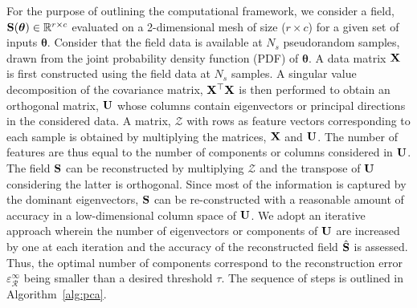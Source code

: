 For the purpose of outlining the computational framework, we consider a field,
$\mathbf{{S}}(\bm{\theta})\in\mathbb{R}^{r\times c}$ evaluated on a 2-dimensional mesh of size ($r\times c$)
for a given set of inputs $\bm{\theta}$. Consider that the field data is available at $N_s$ pseudorandom
samples, drawn from the joint probability density function (PDF) of $\bm{\theta}$. A data matrix $\mathbf{{X}}$ is
first constructed using the field data at $N_s$ samples. A singular value decomposition of the covariance
matrix, $\mathbf{{X^\top X}}$ is then performed to obtain an orthogonal matrix, $\mathbf{{U}}$ whose columns 
contain eigenvectors or principal directions in the considered data. A matrix, $\mathcal{Z}$ with 
rows as feature vectors corresponding to each
sample is obtained by multiplying the matrices, $\mathbf{{X}}$ and $\mathbf{{U}}$. The number of features
are thus equal to the number of components or columns considered in $\mathbf{{U}}$. 
The field $\mathbf{{S}}$ can be reconstructed by multiplying $\mathcal{Z}$ and the transpose of $\mathbf{{U}}$
considering the latter is orthogonal. 
Since most of the information is captured by the dominant eigenvectors, $\mathbf{{S}}$ can be re-constructed with a
reasonable amount of accuracy in a low-dimensional column space of $\mathbf{{U}}$. We adopt an iterative
approach wherein the number of eigenvectors or components of $\mathbf{{U}}$ are increased by one at each iteration
and the accuracy of the reconstructed field $\hat{\mathbf{{S}}}$ is assessed. Thus, the optimal number of components
correspond to the reconstruction error~$\varepsilon_\mathcal{R}^\infty$ 
being smaller than a desired threshold $\tau$. The sequence of steps
is outlined in Algorithm~\ref{alg:pca}.
%
\bigskip
